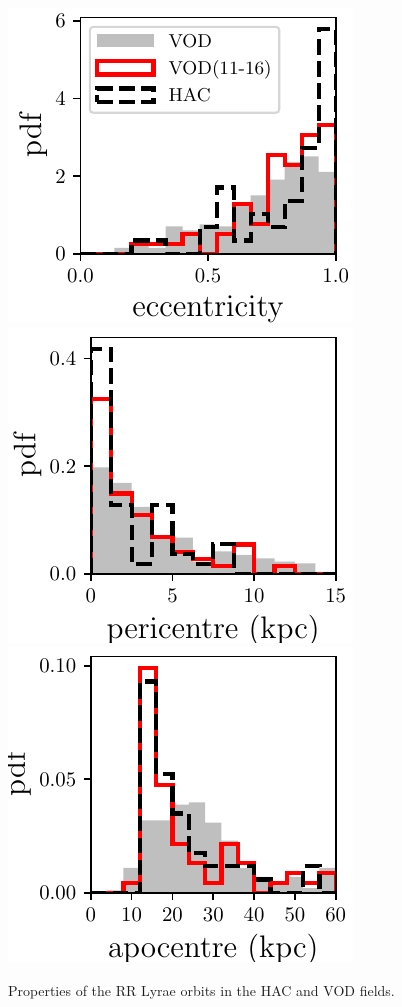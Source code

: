 \documentclass[fleqn,usenatbib]{mnras}
\begin{document}
\begin{figure}
              \includegraphics[scale=0.473]{eccentricities.pdf} 
    \includegraphics[scale=0.473]{pericentres.pdf} 
                          \includegraphics[scale=0.473]{apocentres.pdf} 
\vspace{-0.4cm}
  \caption{Properties of the RR Lyrae orbits in the HAC and VOD fields. }
    \label{fig:orbits}   
    \end{figure}
\end{document}
